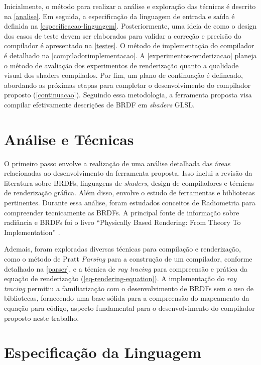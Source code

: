 \documentclass[english, 
               brazil, 
               bsc] %
               {dcomp-abntex2}
\begin{document}
Inicialmente, o método para realizar a análise e exploração das técnicas é descrito na \autoref{analise}. Em seguida, a especificação da linguagem de entrada e saída é definida na \autoref{especificacao-linguagem}. Posteriormente, uma ideia de como o design dos casos de teste devem ser elaborados para validar a correção e precisão do compilador é apresentado na \autoref{testes}. O método de implementação do compilador é detalhado na \autoref{compiladorimplementacao}. A \autoref{experimentos-renderizacao} planeja o método de avaliação dos experimentos de renderização quanto a qualidade visual dos shaders compilados. Por fim, um plano de continuação é delineado, abordando as próximas etapas para completar o desenvolvimento do compilador proposto (\autoref{continuacao}).
Seguindo essa metodologia, a ferramenta proposta visa compilar efetivamente descrições de BRDF em \textit{shaders} GLSL.


\section{Análise e Técnicas} \label{analise}




O primeiro passo envolve a realização de uma análise detalhada das áreas relacionadas ao desenvolvimento da ferramenta proposta. Isso inclui a revisão da literatura \cite{revisao} sobre BRDFs, linguagens de \textit{shaders}, design de compiladores e técnicas de renderização gráfica. Além disso, envolve o estudo de ferramentas e bibliotecas pertinentes. Durante essa análise, foram estudados conceitos de Radiometria para compreender tecnicamente as BRDFs. A principal fonte de informação sobre radiância e BRDFs foi o livro ``Physically Based Rendering: From Theory To Implementation'' \cite{pbr}.


Ademais, foram exploradas diversas técnicas para compilação e renderização, como o método de Pratt \textit{Parsing} para a construção de um compilador, conforme detalhado na \ref{parser}, e a técnica de \textit{ray tracing} para compreensão e prática da equação de renderização (\autoref{eq-rendering-equation}). A implementação do \textit{ray tracing} permitiu a familiarização com o desenvolvimento de BRDFs sem o uso de bibliotecas, fornecendo uma base sólida para a compreensão do mapeamento da equação para código, aspecto fundamental para o desenvolvimento do compilador proposto neste trabalho.


\section{Especificação da Linguagem}\label{especificacao-linguagem}
\end{document}
